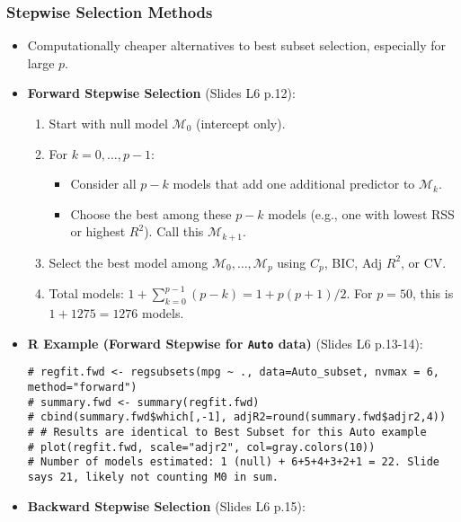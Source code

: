 \documentclass[12pt,a4paper]{article}
\newcommand{\Robject}[1]{\texttt{#1}} %
\begin{document}
\begin{itemize}
\begin{itemize}
\begin{itemize}
    \subsubsection{Stepwise Selection Methods }
        \begin{itemize}
            \item Computationally cheaper alternatives to best subset selection, especially for large $p$.
            \item \textbf{Forward Stepwise Selection} (Slides L6 p.12):
                \begin{enumerate}
                    \item Start with null model $\mathcal{M}_0$ (intercept only).
                    \item For $k=0, \dots, p-1$:
                        \begin{itemize}
                            \item Consider all $p-k$ models that add one additional predictor to $\mathcal{M}_k$.
                            \item Choose the best among these $p-k$ models (e.g., one with lowest RSS or highest $R^2$). Call this $\mathcal{M}_{k+1}$.
                        \end{itemize}
                    \item Select the best model among $\mathcal{M}_0, \dots, \mathcal{M}_p$ using $C_p$, BIC, Adj $R^2$, or CV.
                    \item Total models: $1 + \sum_{k=0}^{p-1} (p-k) = 1 + p(p+1)/2$. For $p=50$, this is $1+1275=1276$ models.
                \end{enumerate}
            \item \textbf{R Example (Forward Stepwise for \Robject{Auto} data)} (Slides L6 p.13-14):
\begin{lstlisting}[caption={Forward Stepwise with leaps::regsubsets (Slides L6 p.13)}]
# regfit.fwd <- regsubsets(mpg ~ ., data=Auto_subset, nvmax = 6, method="forward")
# summary.fwd <- summary(regfit.fwd)
# cbind(summary.fwd$which[,-1], adjR2=round(summary.fwd$adjr2,4))
# # Results are identical to Best Subset for this Auto example
# plot(regfit.fwd, scale="adjr2", col=gray.colors(10))
# Number of models estimated: 1 (null) + 6+5+4+3+2+1 = 22. Slide says 21, likely not counting M0 in sum.
\end{lstlisting}
            \item \textbf{Backward Stepwise Selection} (Slides L6 p.15):
                \begin{enumerate}

\end{enumerate}
\end{itemize}
\end{itemize}
\end{itemize}
\end{itemize}
\end{document}
